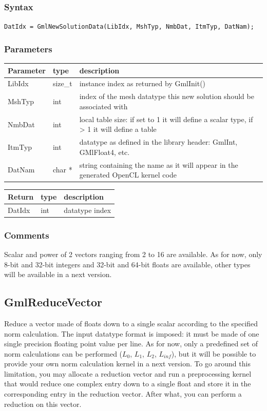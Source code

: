 \documentclass[a4paper,12pt]{article}
\begin{document}
\subsubsection*{Syntax}
{\tt DatIdx = GmlNewSolutionData(LibIdx, MshTyp, NmbDat, ItmTyp, DatNam);}

\subsubsection*{Parameters}
\begin{tabular}{|m{2cm}|m{1.5cm}|m{10.5cm}|}
\hline
Parameter  & type    & description \\
\hline
LibIdx     & size\_t & instance index as returned by GmlInit() \\
\hline
MshTyp     & int     & index of the mesh datatype this new solution should be associated with \\
\hline
NmbDat     & int     & local table size: if set to 1 it will define a scalar type, if > 1 it will define a table \\
\hline
ItmTyp     & int     & datatype as defined in the library header: GmlInt, GMlFloat4, etc. \\
\hline
DatNam     & char *  & string containing the name as it will appear in the generated OpenCL kernel code \\
\hline
\end{tabular}

\medskip

\begin{tabular}{|m{2cm}|m{1.5cm}|m{10.5cm}|}
\hline
Return     & type   & description \\
\hline
DatIdx     & int    & datatype index \\
\hline
\end{tabular}

\subsubsection*{Comments}
Scalar and power of 2 vectors ranging from 2 to 16 are available. As for now, only 8-bit and 32-bit integers and 32-bit and 64-bit floats are available, other types will be available in a next version.


\subsection{GmlReduceVector}
Reduce a vector made of floats down to a single scalar according to the specified norm calculation. The input datatype format is imposed: it must be made of one single precision floating point value per line. As for now, only a predefined set of norm calculations can be performed ($L_0$, $L_1$, $L_2$, $L_{inf}$), but it will be possible to provide your own norm calculation kernel in a next version. To go around this limitation, you may allocate a reduction vector and run a preprocessing kernel that would reduce one complex entry down to a single float and store it in the corresponding entry in the reduction vector. After what, you can perform a reduction on this vector.
\end{document}
